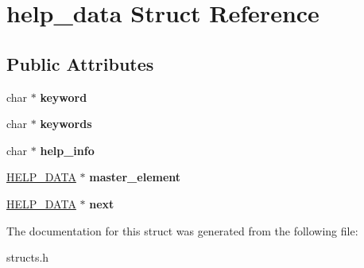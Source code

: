 \hypertarget{structhelp__data}{\section{help\-\_\-data Struct Reference}
\label{structhelp__data}
}
\subsection*{Public Attributes}
\begin{DoxyCompactItemize}
\item 
\hypertarget{structhelp__data_add6106e94cd862ac363b11d1d9ecf9dd}{char $\ast$ {\bfseries keyword}}\label{structhelp__data_add6106e94cd862ac363b11d1d9ecf9dd}

\item 
\hypertarget{structhelp__data_a17cfce6421d96e59b19a0e9b8bf32913}{char $\ast$ {\bfseries keywords}}\label{structhelp__data_a17cfce6421d96e59b19a0e9b8bf32913}

\item 
\hypertarget{structhelp__data_a26cb1630f8e38b9163274fd62941d55d}{char $\ast$ {\bfseries help\-\_\-info}}\label{structhelp__data_a26cb1630f8e38b9163274fd62941d55d}

\item 
\hypertarget{structhelp__data_a4b0c86f841a57010ff73222c6967e86f}{\hyperlink{structhelp__data}{H\-E\-L\-P\-\_\-\-D\-A\-T\-A} $\ast$ {\bfseries master\-\_\-element}}\label{structhelp__data_a4b0c86f841a57010ff73222c6967e86f}

\item 
\hypertarget{structhelp__data_a5e9c4f39cfc8bc5ad3d28f9141c9fc1d}{\hyperlink{structhelp__data}{H\-E\-L\-P\-\_\-\-D\-A\-T\-A} $\ast$ {\bfseries next}}\label{structhelp__data_a5e9c4f39cfc8bc5ad3d28f9141c9fc1d}

\end{DoxyCompactItemize}


The documentation for this struct was generated from the following file\-:\begin{DoxyCompactItemize}
\item 
structs.\-h\end{DoxyCompactItemize}
